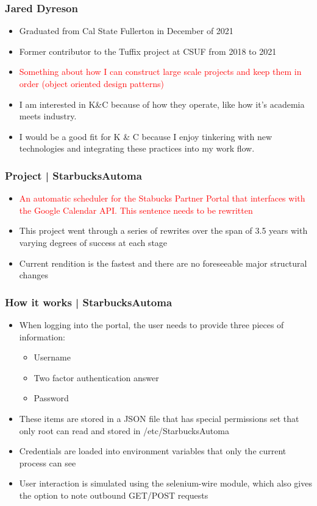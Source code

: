 \documentclass{beamer}
\begin{document}
\begin{frame}[fragile]
\frametitle{Jared Dyreson}
\begin{itemize}
		\item Graduated from Cal State Fullerton in December of 2021
		\item Former contributor to the Tuffix project at CSUF from 2018 to 2021
		\item \textcolor{red}{Something about how I can construct large scale projects and keep them in order (object oriented design patterns)}
		\item I am interested in K\&C because of how they operate, like how it's academia meets industry. 
		\item I would be a good fit for K \& C because I enjoy tinkering with new technologies and integrating these practices into my work flow.
\end{itemize}
\end{frame}

\begin{frame}
\frametitle{Project | StarbucksAutoma} 

\begin{itemize}
		\item \textcolor{red}{An automatic scheduler for the Stabucks Partner Portal that interfaces with the Google Calendar API. This sentence needs to be rewritten}
		\item This project went through a series of rewrites over the span of 3.5 years with varying degrees of success at each stage
		\item Current rendition is the fastest and there are no foreseeable major structural changes
\end{itemize}

\end{frame}

\begin{frame}
\frametitle{How it works | StarbucksAutoma}
\begin{itemize}
		\item When logging into the portal, the user needs to provide three pieces of information:
				\begin{itemize}
						\item Username
						\item Two factor authentication answer
						\item Password
				\end{itemize}
		\item These items are stored in a JSON file that has special permissions set that only root can read and stored in /etc/StarbucksAutoma
		\item Credentials are loaded into environment variables that only the current process can see
		\item User interaction is simulated using the selenium-wire module, which also gives the option to note outbound GET/POST requests
\end{itemize}
\end{frame}
\end{document}
